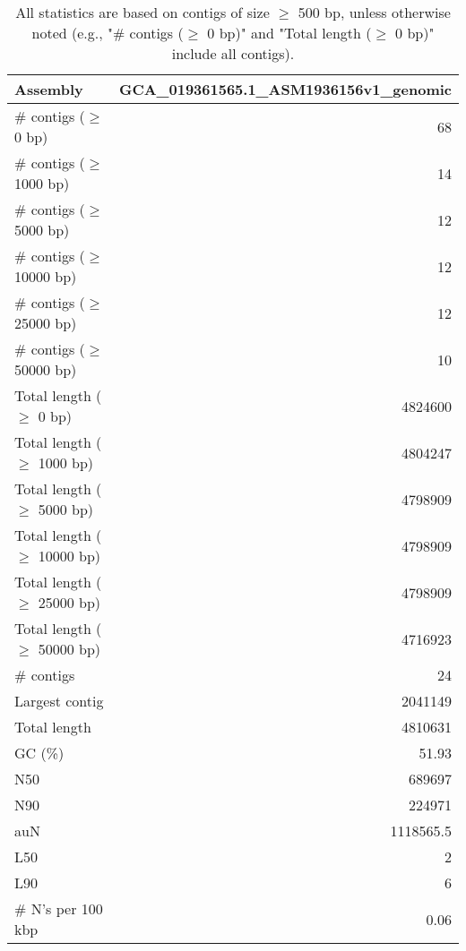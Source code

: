 \documentclass[12pt,a4paper]{article}
\begin{document}
\begin{table}[ht]
\begin{center}
\caption{All statistics are based on contigs of size $\geq$ 500 bp, unless otherwise noted (e.g., "\# contigs ($\geq$ 0 bp)" and "Total length ($\geq$ 0 bp)" include all contigs).}
\begin{tabular}{|l*{1}{|r}|}
\hline
Assembly & GCA\_019361565.1\_ASM1936156v1\_genomic \\ \hline
\# contigs ($\geq$ 0 bp) & 68 \\ \hline
\# contigs ($\geq$ 1000 bp) & 14 \\ \hline
\# contigs ($\geq$ 5000 bp) & 12 \\ \hline
\# contigs ($\geq$ 10000 bp) & 12 \\ \hline
\# contigs ($\geq$ 25000 bp) & 12 \\ \hline
\# contigs ($\geq$ 50000 bp) & 10 \\ \hline
Total length ($\geq$ 0 bp) & 4824600 \\ \hline
Total length ($\geq$ 1000 bp) & 4804247 \\ \hline
Total length ($\geq$ 5000 bp) & 4798909 \\ \hline
Total length ($\geq$ 10000 bp) & 4798909 \\ \hline
Total length ($\geq$ 25000 bp) & 4798909 \\ \hline
Total length ($\geq$ 50000 bp) & 4716923 \\ \hline
\# contigs & 24 \\ \hline
Largest contig & 2041149 \\ \hline
Total length & 4810631 \\ \hline
GC (\%) & 51.93 \\ \hline
N50 & 689697 \\ \hline
N90 & 224971 \\ \hline
auN & 1118565.5 \\ \hline
L50 & 2 \\ \hline
L90 & 6 \\ \hline
\# N's per 100 kbp & 0.06 \\ \hline
\end{tabular}
\end{center}
\end{table}
\end{document}
